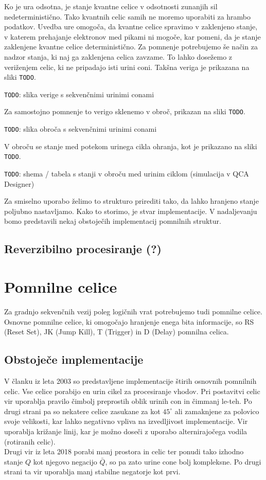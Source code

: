 \documentclass[a4paper, 11pt]{article}
\newcommand{\todo}{\textcolor{BrickRed}{\texttt{TODO}}} %
\begin{document}
Ko je ura odsotna, je stanje kvantne celice v odsotnosti zunanjih sil nedeterministično.
Tako kvantnih celic samih ne moremo uporabiti za hrambo podatkov.
Uvedba ure omogoča, da kvantne celice spravimo v zaklenjeno stanje, v katerem prehajanje elektronov med pikami ni mogoče, kar pomeni, da je stanje zaklenjene kvantne celice deterministično.
Za pomnenje potrebujemo še način za nadzor stanja, ki naj ga zaklenjena celica zavzame.
To lahko dosežemo z veriženjem celic, ki ne pripadajo isti urini coni.
Takšna veriga je prikazana na sliki \todo.

\todo: slika verige s sekvenčnimi urinimi conami

Za samostojno pomnenje to verigo sklenemo v obroč, prikazan na sliki \todo.

\todo: slika obroča s sekvenčnimi urinimi conami

V obroču se stanje med potekom urinega cikla ohranja, kot je prikazano na sliki \todo.

\todo: shema / tabela s stanji v obroču med urinim ciklom (simulacija v QCA Designer)

Za smiselno uporabo želimo to strukturo prirediti tako, da lahko hranjeno stanje poljubno nastavljamo.
Kako to storimo, je stvar implementacije.
V nadaljevanju bomo predstavili nekaj obstoječih implementacij pomnilnih struktur.

\subsection{Reverzibilno procesiranje (?)}



\section{Pomnilne celice}
Za gradnjo sekvenčnih vezij poleg logičnih vrat potrebujemo tudi pomnilne celice. Osnovne pomnilne celice, ki omogočajo hranjenje enega bita informacije, so RS (Reset Set), JK (Jump Kill), T (Trigger) in D (Delay) pomnilna celica. 


\subsection{Obstoječe implementacije}
V članku \cite{quantum_dot} iz leta 2003 so predstavljene implementacije štirih osnovnih pomnilnih celic. Vse celice porabijo en urin cikel za procesiranje vhodov. Pri postavitvi celic vir uporablja pravilo čimbolj preprostih oblik urinih con in čimmanj le-teh. Po drugi strani pa so nekatere celice zasukane za kot $ 45^{\circ} $ ali zamaknjene za polovico svoje velikosti, kar lahko negativno vpliva na izvedljivost implementacije. Vir uporablja križanje linij, kar je možno doseči z uporabo alternirajočega vodila (rotiranih celic). \\ Drugi vir \cite{a_novel_approach} iz leta 2018 porabi manj prostora in celic ter ponudi tako izhodno stanje $Q$ kot njegovo negacijo $\bar{Q}$, so pa zato urine cone bolj kompleksne. Po drugi strani ta vir uporablja manj stabilne negatorje kot prvi.
\end{document}
